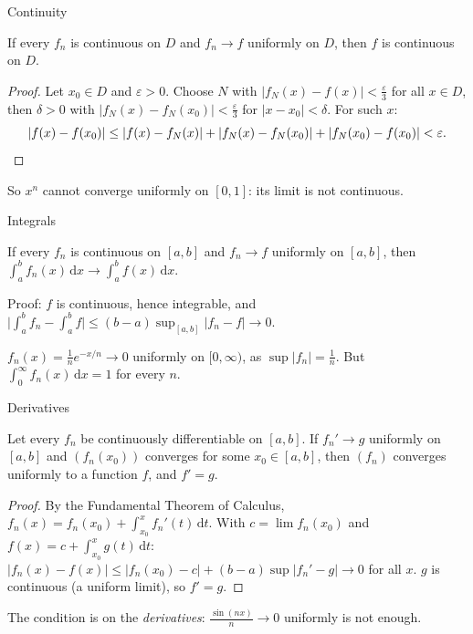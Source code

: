 \documentclass[10pt]{wosm-slides}
\newcommand{\dx}{\,\mathrm{d}x}
\newcommand{\dt}{\,\mathrm{d}t}
\begin{document}
\begin{frame}{Continuity}
  \begin{theorem}
    If every $f_n$ is continuous on $D$ and $f_n \to f$ uniformly on $D$,
    then $f$ is continuous on $D$.
  \end{theorem}
  \pause
  \begin{proof}
    Let $x_0 \in D$ and $\varepsilon > 0$. Choose $N$ with $|f_N(x) - f(x)| < \frac\varepsilon3$
    for all $x \in D$, then $\delta > 0$ with $|f_N(x) - f_N(x_0)| < \frac\varepsilon3$ for
    $|x - x_0| < \delta$. For such $x$:
    \[ |f(x) - f(x_0)| \le |f(x) - f_N(x)| + |f_N(x) - f_N(x_0)| + |f_N(x_0) - f(x_0)|
       < \varepsilon . \qedhere \]
  \end{proof}
  \pause
  {\small So $x^n$ cannot converge uniformly on $[0, 1]$: its limit is not continuous.\par}
\end{frame}

\begin{frame}{Integrals}
  \begin{theorem}
    If every $f_n$ is continuous on $[a, b]$ and $f_n \to f$ uniformly on $[a, b]$, then
    $\int_a^b f_n(x)\dx \to \int_a^b f(x)\dx$.
  \end{theorem}
  {\small Proof: $f$ is continuous, hence integrable, and
  $\bigl|\int_a^b f_n - \int_a^b f\bigr| \le (b - a) \sup_{[a,b]} |f_n - f| \to 0$.\par}
  \pause
  \begin{warning}
    $f_n(x) = \frac1n e^{-x/n} \to 0$ uniformly on $[0, \infty)$, as $\sup |f_n| = \frac1n$.
    But $\int_0^\infty f_n(x)\dx = 1$ for every $n$.
  \end{warning}
\end{frame}

\begin{frame}{Derivatives}
  \begin{theorem}
    Let every $f_n$ be continuously differentiable on $[a, b]$. If $f_n' \to g$ uniformly on
    $[a, b]$ and $(f_n(x_0))$ converges for some $x_0 \in [a, b]$, then $(f_n)$ converges
    uniformly to a function $f$, and $f' = g$.
  \end{theorem}
  \pause
  \begin{proof}
    By the Fundamental Theorem of Calculus,
    $f_n(x) = f_n(x_0) + \int_{x_0}^{x} f_n'(t)\dt$.
    With $c = \lim f_n(x_0)$ and $f(x) = c + \int_{x_0}^x g(t)\dt$:
    $|f_n(x) - f(x)| \le |f_n(x_0) - c| + (b - a) \sup |f_n' - g| \to 0$ for all $x$.
    $g$ is continuous (a uniform limit), so $f' = g$.
  \end{proof}
  {\small The condition is on the \emph{derivatives}: $\frac{\sin(nx)}{n} \to 0$ uniformly is
  not enough.\par}
\end{frame}
\end{document}
